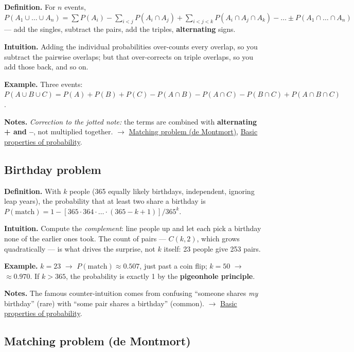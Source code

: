 \documentclass[11pt,a4paper]{article}
\begin{document}
\textbf{Definition.} For $n$ events, $P(A_{1} \cup  \ldots  \cup  A_{n}) = \sum  P(A_{i}) - \sum _{i<j} P(A_{i} \cap  A_{j}) + \sum _{i<j<k} P(A_{i} \cap  A_{j} \cap  A_k) - \ldots  \pm  P(A_{1} \cap  \ldots  \cap  A_{n})$ --- add the singles, subtract the pairs, add the triples, \textbf{alternating} signs.

\textbf{Intuition.} Adding the individual probabilities over-counts every overlap, so you subtract the pairwise overlaps; but that over-corrects on triple overlaps, so you add those back, and so on.

\textbf{Example.} Three events: $P(A \cup  B \cup  C) = P(A)+P(B)+P(C) - P(A\cap B) - P(A\cap C) - P(B\cap C) + P(A\cap B\cap C)$.

\textbf{Notes.} \textit{Correction to the jotted note:} the terms are combined with \textbf{alternating + and --}, not multiplied together. $\to$ \hyperref[sec:matching-problem-de-montmort]{Matching problem (de Montmort)}, \hyperref[sec:basic-properties-of-probability]{Basic properties of probability}.

\subsection{Birthday problem}\label{sec:birthday-problem}

\textbf{Definition.} With $k$ people (365 equally likely birthdays, independent, ignoring leap years), the probability that at least two share a birthday is $P(\text{match}) = 1 - [365 \cdot  364 \cdot  \ldots  \cdot  (365 - k + 1)] / 365^{k}$.

\textbf{Intuition.} Compute the \textit{complement}: line people up and let each pick a birthday none of the earlier ones took. The count of pairs --- $C(k,2)$, which grows quadratically --- is what drives the surprise, not $k$ itself: 23 people give 253 pairs.

\textbf{Example.} $k = 23$ $\to$ $P(\text{match}) \approx  0.507$, just past a coin flip; $k = 50$ $\to$ $\approx  0.970$. If $k > 365$, the probability is exactly 1 by the \textbf{pigeonhole principle}.

\textbf{Notes.} The famous counter-intuition comes from confusing ``someone shares \textit{my} birthday'' (rare) with ``some pair shares a birthday'' (common). $\to$ \hyperref[sec:basic-properties-of-probability]{Basic properties of probability}.

\subsection{Matching problem (de Montmort)}\label{sec:matching-problem-de-montmort}
\end{document}
